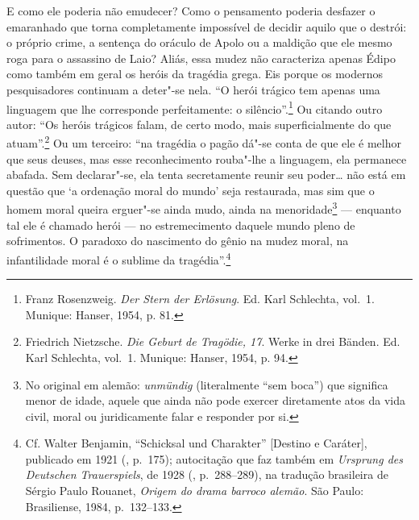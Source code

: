 E como ele poderia não emudecer? Como o pensamento poderia desfazer o
emaranhado que torna completamente impossível de decidir aquilo que o destrói: o
próprio crime, a sentença do oráculo de Apolo ou a maldição que ele
mesmo roga para o assassino de Laio? Aliás, essa mudez não caracteriza
apenas Édipo como também em geral os heróis da tragédia grega. Eis
porque os modernos pesquisadores continuam a deter"-se nela. ``O herói
trágico tem apenas uma linguagem que lhe corresponde perfeitamente: o
silêncio''.\footnote{Franz Rosenzweig. \emph{Der Stern der
  Erlösung}. Ed. Karl Schlechta, vol.~1. Munique: Hanser, 1954, p. 81. \versal{[N.~O.]}}
Ou citando outro autor: ``Os heróis trágicos falam, de certo modo, mais
superficialmente do que atuam''.\footnote{Friedrich Nietzsche.
  \emph{Die Geburt de Tragödie, 17}. Werke in drei Bänden. Ed.
  Karl Schlechta, vol.~1. Munique: Hanser, 1954, p. 94. \versal{[N.~O.]}} Ou um terceiro: ``na
tragédia o pagão dá"-se conta de que ele é melhor que seus deuses, mas
esse reconhecimento rouba"-lhe a linguagem, ela permanece abafada. Sem
declarar"-se, ela tenta secretamente reunir seu poder\ldots{} não está em
questão que `a ordenação moral do mundo' seja restaurada, mas sim que o
homem moral queira erguer"-se ainda mudo, ainda na menoridade\footnote{No original em alemão: \emph{unmündig} (literalmente ``sem boca'') que significa
  menor de idade, aquele que ainda não pode exercer diretamente atos da
  vida civil, moral ou juridicamente falar e responder por si. \versal{[N.~T.]}} ---
enquanto tal ele é chamado herói --- no estremecimento daquele mundo
pleno de sofrimentos. O paradoxo do nascimento do gênio na mudez moral,
na infantilidade moral é o sublime da tragédia''.\footnote{Cf.
  Walter Benjamin, ``Schicksal und Charakter'' {[}Destino e Caráter{]},
  publicado em 1921 (, p.~175); autocitação que faz também em
  \emph{Ursprung des Deutschen Trauerspiels}, de 1928 (, p.~288--289),
  na tradução brasileira de Sérgio Paulo Rouanet, \emph{Origem do drama
  barroco alemão}. São Paulo: Brasiliense, 1984, p.~132--133. \versal{[N.~T.]}}

